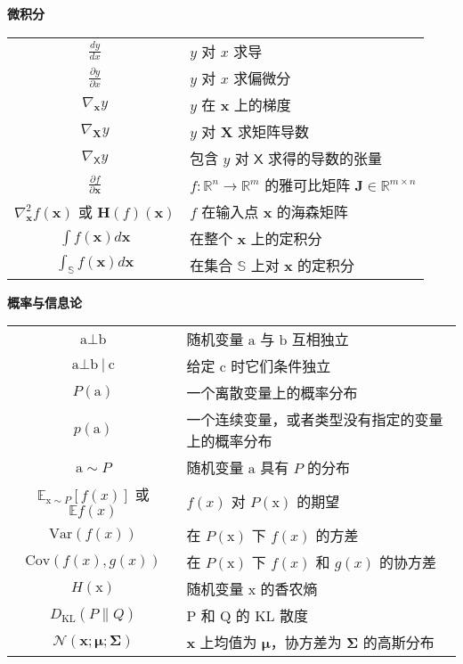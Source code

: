 \begin{center}
  {\Large\bfseries 微积分}\\
  \vspace{1em}
  \begin{tabular}{c l}
    $\frac{dy}{dx}$ & $y$ 对 $x$ 求导 \\
    $\frac{\partial y}{\partial x}$ & $y$ 对 $x$ 求偏微分 \\
    $\nabla_{\pmb{x}}y$ & $y$ 在 $\pmb{x}$ 上的梯度 \\
    $\nabla_{\pmb{X}}y$ & $y$ 对 $\pmb{X}$ 求矩阵导数 \\
    $\nabla_{\pmb{\mathsf{X}}}y$ & 包含 $y$ 对 $\pmb{\mathsf{X}}$ 求得的导数的张量 \\
    $\frac{\partial f}{\partial \pmb{x}}$ & $f : \mathbb{R}^n \rightarrow \mathbb{R}^m$ 的雅可比矩阵 $\pmb{J} \in \mathbb{R}^{m \times n}$ \\
    $\nabla^2_{\pmb{x}}f(\pmb{x})$ 或 $\pmb{H}(f)(\pmb{x})$ & $f$ 在输入点 $\pmb{x}$ 的海森矩阵\\
    $\int f(\pmb{x})d\pmb{x}$ & 在整个 $\pmb{x}$ 上的定积分\\
    $\int_{\mathbb{S}} f(\pmb{x})d\pmb{x}$ & 在集合 $\mathbb{S}$ 上对 $\pmb{x}$ 的定积分 \\
  \end{tabular}
\end{center}

\vspace{1em}

\begin{center}
  {\Large\bfseries 概率与信息论}\\
  \vspace{1em}
  \begin{tabular}{c l}
    $\mathrm{a} \bot \mathrm{b}$ & 随机变量 $\mathrm{a}$ 与 $\mathrm{b}$ 互相独立 \\
    $\mathrm{a} \bot \mathrm{b}\: | \: \mathrm{c}$ & 给定 $\mathrm{c}$ 时它们条件独立 \\
    $P(\mathrm{a})$ & 一个离散变量上的概率分布 \\
    $p(\mathrm{a})$ & 一个连续变量，或者类型没有指定的变量上的概率分布 \\
    $\mathrm{a} \sim P$ & 随机变量 $\mathrm{a}$ 具有 $P$ 的分布 \\
    $\mathbb{E}_{\mathrm{x} \sim P} [f(x)]$ 或 $\mathbb{E}f(x)$ & $f(x)$ 对 $P(\mathrm{x})$ 的期望 \\
    $\mathrm{Var}(f(x))$ & 在 $P(\mathrm{x})$ 下 $f(x)$ 的方差 \\
    $\mathrm{Cov}(f(x),g(x))$ & 在 $P(\mathrm{x})$ 下 $f(x)$ 和 $g(x)$ 的协方差 \\
    $H(\mathrm{x})$ & 随机变量 $\mathrm{x}$ 的香农熵 \\
    $D_{\mathrm{KL}}(P \parallel Q)$ & $\mathrm{P}$ 和 $\mathrm{Q}$ 的 $\mathrm{KL}$ 散度 \\
    $\mathcal{N}(\pmb{x};\pmb{\mu};\pmb{\Sigma})$ & $\pmb{x}$ 上均值为 $\pmb{\mu}$，协方差为 $\pmb{\Sigma}$ 的高斯分布 \\
  \end{tabular}
\end{center}

